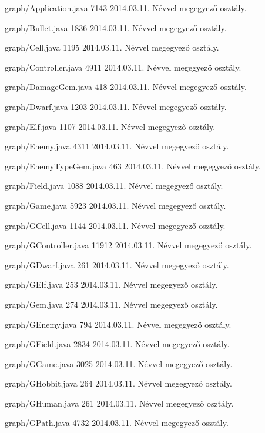\begin{fajllista}

\fajl
{graph/Application.java}
{7143}
{2014.03.11.}
{Névvel megegyező osztály.}

\fajl
{graph/Bullet.java}
{1836}
{2014.03.11.}
{Névvel megegyező osztály.}

\fajl
{graph/Cell.java}
{1195}
{2014.03.11.}
{Névvel megegyező osztály.}

\fajl
{graph/Controller.java}
{4911}
{2014.03.11.}
{Névvel megegyező osztály.}

\fajl
{graph/DamageGem.java}
{418}
{2014.03.11.}
{Névvel megegyező osztály.}

\fajl
{graph/Dwarf.java}
{1203}
{2014.03.11.}
{Névvel megegyező osztály.}

\fajl
{graph/Elf.java}
{1107}
{2014.03.11.}
{Névvel megegyező osztály.}

\fajl
{graph/Enemy.java}
{4311}
{2014.03.11.}
{Névvel megegyező osztály.}

\fajl
{graph/EnemyTypeGem.java}
{463}
{2014.03.11.}
{Névvel megegyező osztály.}

\fajl
{graph/Field.java}
{1088}
{2014.03.11.}
{Névvel megegyező osztály.}

\fajl
{graph/Game.java}
{5923}
{2014.03.11.}
{Névvel megegyező osztály.}

\fajl
{graph/GCell.java}
{1144}
{2014.03.11.}
{Névvel megegyező osztály.}

\fajl
{graph/GController.java}
{11912}
{2014.03.11.}
{Névvel megegyező osztály.}

\fajl
{graph/GDwarf.java}
{261}
{2014.03.11.}
{Névvel megegyező osztály.}

\fajl
{graph/GElf.java}
{253}
{2014.03.11.}
{Névvel megegyező osztály.}

\fajl
{graph/Gem.java}
{274}
{2014.03.11.}
{Névvel megegyező osztály.}

\fajl
{graph/GEnemy.java}
{794}
{2014.03.11.}
{Névvel megegyező osztály.}

\fajl
{graph/GField.java}
{2834}
{2014.03.11.}
{Névvel megegyező osztály.}

\fajl
{graph/GGame.java}
{3025}
{2014.03.11.}
{Névvel megegyező osztály.}

\fajl
{graph/GHobbit.java}
{264}
{2014.03.11.}
{Névvel megegyező osztály.}

\fajl
{graph/GHuman.java}
{261}
{2014.03.11.}
{Névvel megegyező osztály.}

\fajl
{graph/GPath.java}
{4732}
{2014.03.11.}
{Névvel megegyező osztály.}


\end{fajllista}

